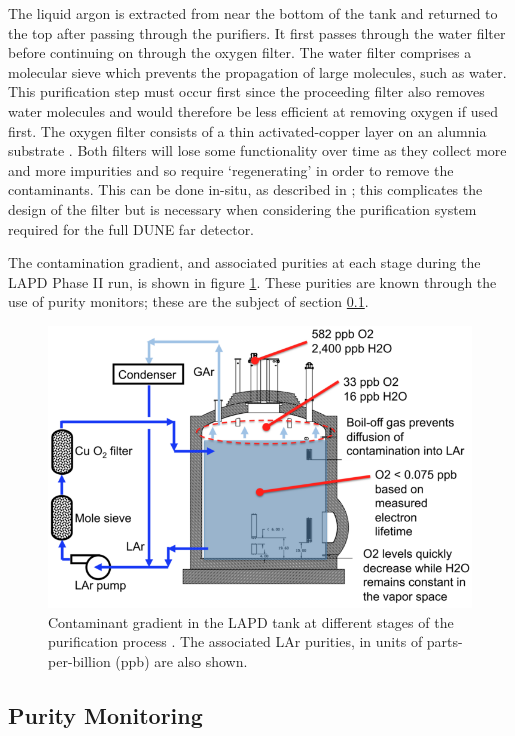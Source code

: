 The liquid argon is extracted from near the bottom of the tank and returned to the top after passing through the purifiers.  It first passes through the water filter before continuing on through the oxygen filter.  The water filter comprises a molecular sieve which prevents the propagation of large molecules, such as water.  This purification step must occur first since the proceeding filter also removes water molecules and would therefore be less efficient at removing oxygen if used first.  The oxygen filter consists of a thin activated-copper layer on an alumnia substrate \cite{LArFilter}.  Both filters will lose some functionality over time as they collect more and more impurities and so require `regenerating' in order to remove the contaminants.  This can be done in-situ, as described in \cite{LArFilter}; this complicates the design of the filter but is necessary when considering the purification system required for the full DUNE far detector.

The contamination gradient, and associated purities at each stage during the LAPD Phase II run, is shown in figure \ref{fig:LAPDPurity}.  These purities are known through the use of purity monitors; these are the subject of section \ref{sec:PurityMonitoring}.

\begin{figure}[ht]
  \centering
  \includegraphics[width=12cm]{LAPDPurity.png}
  \caption{Contaminant gradient in the LAPD tank at different stages of the purification process \cite{LAPD}.  The associated LAr purities, in units of parts-per-billion (ppb) are also shown.}
  \label{fig:LAPDPurity}
\end{figure}

\subsection{Purity Monitoring}\label{sec:PurityMonitoring}

